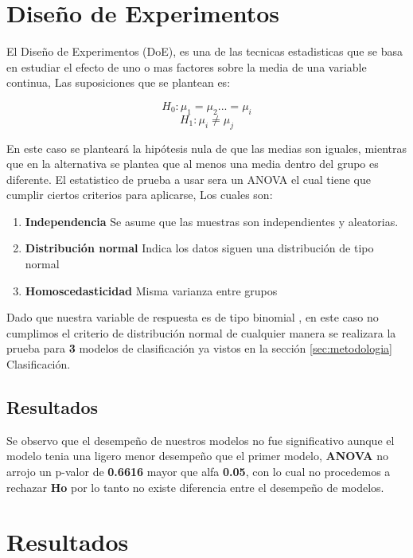 \documentclass[10pt,journal]{IEEEtran}
\begin{document}
\section{Diseño de Experimentos}

El Diseño de Experimentos (DoE), es una de las tecnicas estadisticas que se basa en estudiar el efecto de uno o mas factores sobre la media de una variable continua, Las suposiciones que se plantean es:

\begin{equation}
H_0 : \mu_1 = \mu_2 ... = \mu_i
\end{equation}
\begin{equation}
H_1 : \mu_i \neq \mu_j 
\end{equation}


En este caso se planteará la hipótesis nula de que las medias son iguales, mientras que en la alternativa se plantea que al menos una media dentro del grupo es diferente.
El estatistico de prueba a usar sera un ANOVA el cual tiene que cumplir ciertos criterios para aplicarse, Los cuales son:

\begin{enumerate}
    \item \textbf{Independencia} Se asume que las muestras son independientes y aleatorias.
    \item \textbf{Distribución normal} Indica los datos siguen una distribución de tipo normal
    \item \textbf{Homoscedasticidad} Misma varianza entre grupos 
\end{enumerate}

Dado que nuestra variable de respuesta es de tipo binomial , en este caso no cumplimos el criterio de distribución normal de cualquier manera se realizara la prueba para \textbf{3} modelos de clasificación ya vistos en la sección \ref{sec:metodologia} Clasificación. 

\subsection{Resultados}


Se observo que el desempeño de nuestros modelos no fue significativo aunque el modelo tenia una ligero menor desempeño que el primer modelo, \textbf{ANOVA} no arrojo un p-valor de \textbf{0.6616} mayor que alfa \textbf{0.05}, con lo cual no procedemos a rechazar \textbf{Ho} por lo tanto no existe diferencia entre el desempeño de modelos. 


\section{Resultados}
\end{document}
